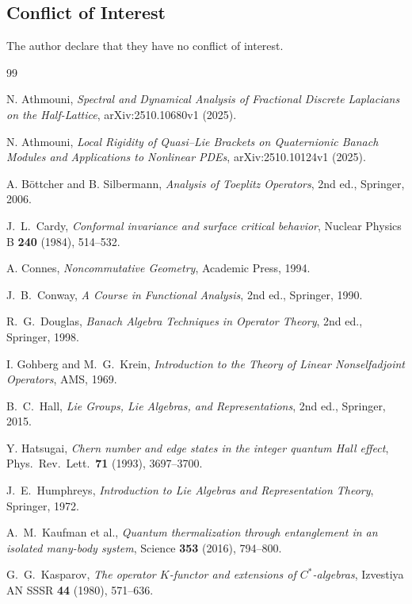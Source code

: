 \documentclass[10pt]{amsart}
\newcommand{\1}{{\mathbb{I}}}
\numberwithin{equation}{section}
\begin{document}
\subsection*{Conflict of Interest}
The author declare that they have no conflict of interest.
\begin{thebibliography}{99}
\sloppy{}

N. Athmouni, \emph{Spectral and Dynamical Analysis of Fractional Discrete Laplacians on the
Half-Lattice}, arXiv:2510.10680v1 (2025).

N. Athmouni, \emph{Local Rigidity of Quasi--Lie Brackets on Quaternionic Banach Modules and
Applications to Nonlinear PDEs}, arXiv:2510.10124v1 (2025).

A. B\"ottcher and B. Silbermann, \emph{Analysis of Toeplitz Operators}, 2nd ed., Springer,
2006.

J.\ L.\ Cardy, \emph{Conformal invariance and surface critical behavior}, Nuclear Physics B
\textbf{240} (1984), 514--532.

A. Connes, \emph{Noncommutative Geometry}, Academic Press, 1994.

J.\ B.\ Conway, \emph{A Course in Functional Analysis}, 2nd ed., Springer, 1990.

R.\ G.\ Douglas, \emph{Banach Algebra Techniques in Operator Theory}, 2nd ed., Springer, 1998.

I. Gohberg and M.\ G.\ Krein, \emph{Introduction to the Theory of Linear Nonselfadjoint
Operators}, AMS, 1969.

B.\ C.\ Hall, \emph{Lie Groups, Lie Algebras, and Representations}, 2nd ed., Springer, 2015.

Y. Hatsugai, \emph{Chern number and edge states in the integer quantum Hall effect},
Phys.\ Rev.\ Lett.\ \textbf{71} (1993), 3697--3700.

J.\ E.\ Humphreys, \emph{Introduction to Lie Algebras and Representation Theory}, Springer,
1972.

A.\ M.\ Kaufman et al., \emph{Quantum thermalization through entanglement in an isolated
many-body system}, Science \textbf{353} (2016), 794--800.

G.\ G.\ Kasparov, \emph{The operator $K$-functor and extensions of $C^*$-algebras},
Izvestiya AN SSSR \textbf{44} (1980), 571--636.


\end{thebibliography}
\end{document}
